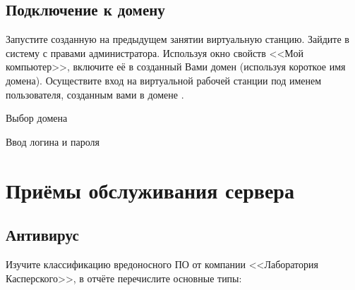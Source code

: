 \subsection{Подключение к домену}

Запустите созданную на предыдущем занятии виртуальную станцию.
Зайдите в систему с правами администратора.
Используя окно свойств <<Мой компьютер>>, включите её в
созданный Вами домен (используя короткое имя домена).
Осуществите вход на виртуальной рабочей станции под именем пользователя,
созданным вами в домене .

\begin{image}
	\caption{Выбор домена}
	\label{fig:connect:domen}
\end{image}

\begin{image}
	\caption{Ввод логина и пароля}
	\label{fig:connect:domen:passw}
\end{image}

\section{Приёмы обслуживания сервера}

\subsection{Антивирус}

Изучите классификацию вредоносного ПО
от компании <<Лаборатория Касперского>>,
в отчёте перечислите основные типы:


